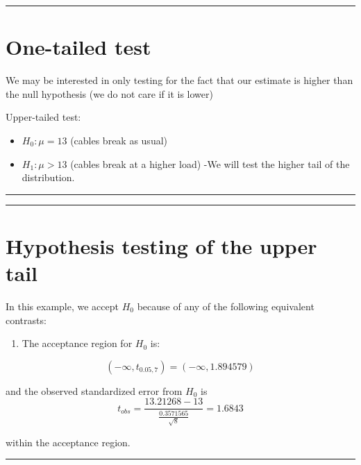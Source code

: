 \documentclass[
]{book}
\providecommand{\tightlist}{%
  \setlength{\itemsep}{0pt}\setlength{\parskip}{0pt}}
\begin{document}
\begin{center}\rule{0.5\linewidth}{0.5pt}\end{center}

\hypertarget{one-tailed-test}{%
\section{One-tailed test}\label{one-tailed-test}}

We may be interested in only testing for the fact that our estimate is higher than the null hypothesis (we do not care if it is lower)

Upper-tailed test:

\begin{itemize}
\tightlist
\item
  \(H_0:\mu = 13\) (cables break as usual)
\item
  \(H_1:\mu > 13\) (cables break at a higher load) -We will test the higher tail of the distribution.
\end{itemize}

\begin{center}\rule{0.5\linewidth}{0.5pt}\end{center}

\begin{center}\rule{0.5\linewidth}{0.5pt}\end{center}

\hypertarget{hypothesis-testing-of-the-upper-tail}{%
\section{Hypothesis testing of the upper tail}\label{hypothesis-testing-of-the-upper-tail}}

In this example, we accept \(H_0\) because of any of the following equivalent contrasts:

\begin{enumerate}
\def\labelenumi{\arabic{enumi}.}
\tightlist
\item
  The acceptance region for \(H_0\) is:
\end{enumerate}

\[(-\infty, t_{0.05,7})=( -\infty,  1.894579)\]

and the observed standardized error from \(H_0\) is
\[t_{obs} =  \frac{13.21268-13}{\frac{0.3571565}{\sqrt{8}}}=1.6843\]

within the acceptance region.

\begin{center}\rule{0.5\linewidth}{0.5pt}\end{center}
\end{document}

